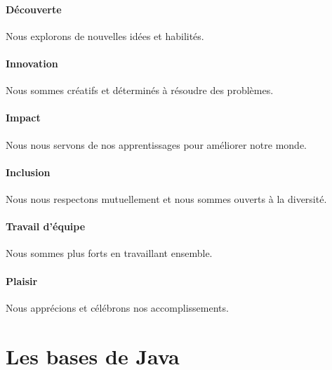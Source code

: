 \documentclass[12pt]{report}
\begin{document}
\subsection*{Découverte}
Nous explorons de nouvelles idées et habilités.

\subsection*{Innovation}
Nous sommes créatifs et déterminés à résoudre des problèmes.

\subsection*{Impact}
Nous nous servons de nos apprentissages pour améliorer notre monde.

\subsection*{Inclusion}
Nous nous respectons mutuellement et nous sommes ouverts à la diversité.

\subsection*{Travail d'équipe}
Nous sommes plus forts en travaillant ensemble.

\subsection*{Plaisir}
Nous apprécions et célébrons nos accomplissements.

\newpage

%
\linespread{1.5}
\normalsize
{}
\setcounter{page}{1}




\part{Les bases de Java}

\end{document}
